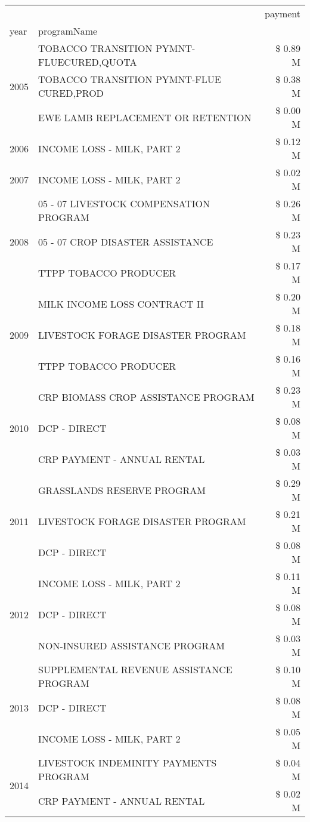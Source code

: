 \begin{tabular}{llr}
\toprule
 &  & payment \\
year & programName &  \\
\midrule
\multirow[t]{3}{*}{2005} & TOBACCO TRANSITION PYMNT-FLUECURED,QUOTA & \$ 0.89 M \\
 & TOBACCO TRANSITION PYMNT-FLUE CURED,PROD & \$ 0.38 M \\
 & EWE LAMB REPLACEMENT OR RETENTION & \$ 0.00 M \\
\cline{1-3}
2006 & INCOME LOSS - MILK, PART 2 & \$ 0.12 M \\
\cline{1-3}
2007 & INCOME LOSS - MILK, PART 2 & \$ 0.02 M \\
\cline{1-3}
\multirow[t]{3}{*}{2008} & 05 - 07 LIVESTOCK COMPENSATION PROGRAM & \$ 0.26 M \\
 & 05 - 07 CROP DISASTER ASSISTANCE & \$ 0.23 M \\
 & TTPP TOBACCO PRODUCER & \$ 0.17 M \\
\cline{1-3}
\multirow[t]{3}{*}{2009} & MILK INCOME LOSS CONTRACT II & \$ 0.20 M \\
 & LIVESTOCK FORAGE DISASTER  PROGRAM & \$ 0.18 M \\
 & TTPP TOBACCO PRODUCER & \$ 0.16 M \\
\cline{1-3}
\multirow[t]{3}{*}{2010} & CRP BIOMASS CROP ASSISTANCE PROGRAM & \$ 0.23 M \\
 & DCP - DIRECT & \$ 0.08 M \\
 & CRP PAYMENT - ANNUAL RENTAL & \$ 0.03 M \\
\cline{1-3}
\multirow[t]{3}{*}{2011} & GRASSLANDS RESERVE PROGRAM & \$ 0.29 M \\
 & LIVESTOCK FORAGE DISASTER PROGRAM & \$ 0.21 M \\
 & DCP - DIRECT & \$ 0.08 M \\
\cline{1-3}
\multirow[t]{3}{*}{2012} & INCOME LOSS - MILK, PART 2 & \$ 0.11 M \\
 & DCP - DIRECT & \$ 0.08 M \\
 & NON-INSURED ASSISTANCE PROGRAM & \$ 0.03 M \\
\cline{1-3}
\multirow[t]{3}{*}{2013} & SUPPLEMENTAL REVENUE ASSISTANCE PROGRAM & \$ 0.10 M \\
 & DCP - DIRECT & \$ 0.08 M \\
 & INCOME LOSS - MILK, PART 2 & \$ 0.05 M \\
\cline{1-3}
\multirow[t]{3}{*}{2014} & LIVESTOCK INDEMINITY PAYMENTS PROGRAM & \$ 0.04 M \\
 & CRP PAYMENT - ANNUAL RENTAL & \$ 0.02 M \\

\end{tabular}
